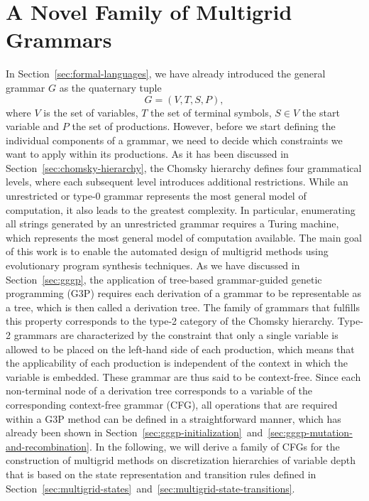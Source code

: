 \section{A Novel Family of Multigrid Grammars}
\label{sec:multigrid-grammar}
In Section~\ref{sec:formal-languages}, we have already introduced the general grammar $G$ as the quaternary tuple 
\begin{equation*}
	G = \left(V, T, S, P \right),
\end{equation*}
where $V$ is the set of variables, $T$ the set of terminal symbols, $S \in V$ the start variable and $P$ the set of productions.
However, before we start defining the individual components of a grammar, we need to decide which constraints we want to apply within its productions.
As it has been discussed in Section~\ref{sec:chomsky-hierarchy}, the Chomsky hierarchy defines four grammatical levels, where each subsequent level introduces additional restrictions.
While an unrestricted or type-0 grammar represents the most general model of computation, it also leads to the greatest complexity.
In particular, enumerating all strings generated by an unrestricted grammar requires a Turing machine, which represents the most general model of computation available.
The main goal of this work is to enable the automated design of multigrid methods using evolutionary program synthesis techniques.
As we have discussed in Section~\ref{sec:gggp}, the application of tree-based grammar-guided genetic programming (G3P) requires each derivation of a grammar to be representable as a tree, which is then called a derivation tree.
The family of grammars that fulfills this property corresponds to the type-2 category of the Chomsky hierarchy.
Type-2 grammars are characterized by the constraint that only a single variable is allowed to be placed on the left-hand side of each production, which means that the applicability of each production is independent of the context in which the variable is embedded. 
These grammar are thus said to be context-free.
Since each non-terminal node of a derivation tree corresponds to a variable of the corresponding context-free grammar (CFG), all operations that are required within a G3P method can be defined in a straightforward manner, which has already been shown in Section~\ref{sec:gggp-initialization}~and~\ref{sec:gggp-mutation-and-recombination}.
In the following, we will derive a family of CFGs for the construction of multigrid methods on discretization hierarchies of variable depth that is based on the state representation and transition rules defined in Section~\ref{sec:multigrid-states}~and~\ref{sec:multigrid-state-transitions}.
